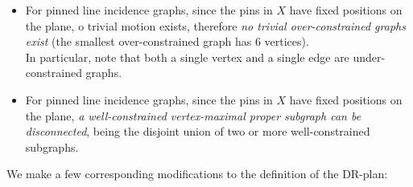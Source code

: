 \begin{itemize}

\item For pinned line incidence graphs, 
since the pins in $X$ have fixed positions on the plane, 
o trivial motion exists, therefore {\em no trivial over-constrained graphs exist} (the smallest over-constrained graph has $6$ vertices).\\
In particular, note that both a single vertex and a single edge are under-constrained graphs.


\item 
For pinned line incidence graphs, 
since the pins in $X$ have fixed positions on the plane, 
{\em a well-constrained vertex-maximal proper subgraph can be disconnected}, 
being the disjoint union of two or more well-constrained subgraphs. \\

\end{itemize}

We make  a few corresponding modifications to the definition of the DR-plan:


